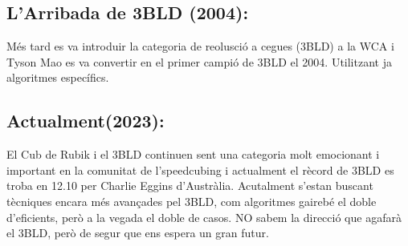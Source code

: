 \subsection{L'Arribada de 3BLD (2004):}

Més tard es va introduir la categoria de reolusció a cegues (3BLD) a la WCA i Tyson Mao es va convertir en el primer campió de 3BLD el 2004. Utilitzant ja algoritmes específics.

\subsection{Actualment(2023):}

El Cub de Rubik i el 3BLD continuen sent una categoria molt emocionant i important en la comunitat de l'speedcubing i actualment el rècord de 3BLD es troba en 12.10 per Charlie Eggins d'Austràlia. Acutalment s'estan buscant tècniques encara més avançades pel 3BLD, com algoritmes gairebé el doble d'eficients, però a la vegada el doble de casos. NO sabem la direcció que agafarà el 3BLD, però de segur que ens espera un gran futur.




